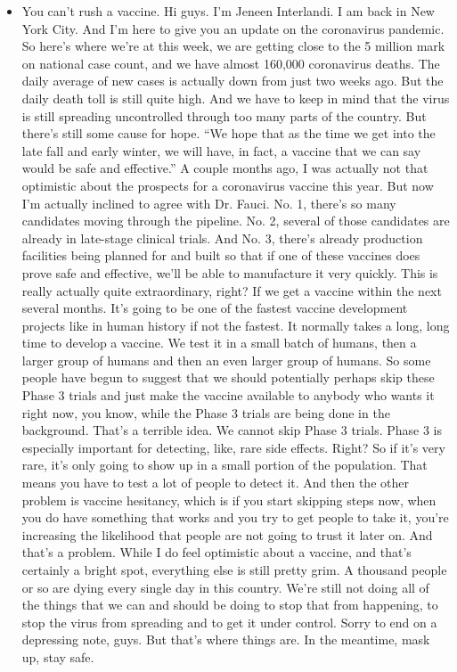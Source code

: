 \begin{itemize}
\tightlist
\item
  You can't rush a vaccine. Hi guys. I'm Jeneen Interlandi. I am back in
  New York City. And I'm here to give you an update on the coronavirus
  pandemic. So here's where we're at this week, we are getting close to
  the 5 million mark on national case count, and we have almost 160,000
  coronavirus deaths. The daily average of new cases is actually down
  from just two weeks ago. But the daily death toll is still quite high.
  And we have to keep in mind that the virus is still spreading
  uncontrolled through too many parts of the country. But there's still
  some cause for hope. ``We hope that as the time we get into the late
  fall and early winter, we will have, in fact, a vaccine that we can
  say would be safe and effective.'' A couple months ago, I was actually
  not that optimistic about the prospects for a coronavirus vaccine this
  year. But now I'm actually inclined to agree with Dr. Fauci. No. 1,
  there's so many candidates moving through the pipeline. No. 2, several
  of those candidates are already in late-stage clinical trials. And No.
  3, there's already production facilities being planned for and built
  so that if one of these vaccines does prove safe and effective, we'll
  be able to manufacture it very quickly. This is really actually quite
  extraordinary, right? If we get a vaccine within the next several
  months. It's going to be one of the fastest vaccine development
  projects like in human history if not the fastest. It normally takes a
  long, long time to develop a vaccine. We test it in a small batch of
  humans, then a larger group of humans and then an even larger group of
  humans. So some people have begun to suggest that we should
  potentially perhaps skip these Phase 3 trials and just make the
  vaccine available to anybody who wants it right now, you know, while
  the Phase 3 trials are being done in the background. That's a terrible
  idea. We cannot skip Phase 3 trials. Phase 3 is especially important
  for detecting, like, rare side effects. Right? So if it's very rare,
  it's only going to show up in a small portion of the population. That
  means you have to test a lot of people to detect it. And then the
  other problem is vaccine hesitancy, which is if you start skipping
  steps now, when you do have something that works and you try to get
  people to take it, you're increasing the likelihood that people are
  not going to trust it later on. And that's a problem. While I do feel
  optimistic about a vaccine, and that's certainly a bright spot,
  everything else is still pretty grim. A thousand people or so are
  dying every single day in this country. We're still not doing all of
  the things that we can and should be doing to stop that from
  happening, to stop the virus from spreading and to get it under
  control. Sorry to end on a depressing note, guys. But that's where
  things are. In the meantime, mask up, stay safe.
\end{itemize}


